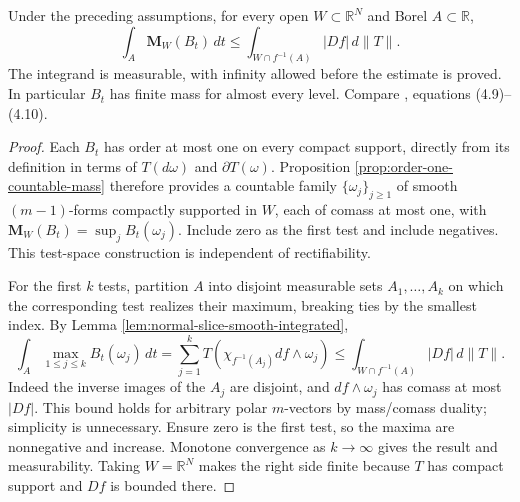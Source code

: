 \begin{proposition}\label{prop:normal-slice-smooth-mass}
Under the preceding assumptions, for every open $W\subset\mathbb R^N$ and Borel $A\subset\mathbb R$,
\[
 \int_A\mathbf M_W(B_t)\,dt
 \leq\int_{W\cap f^{-1}(A)}|Df|\,d\|T\|.
\]
The integrand is measurable, with infinity allowed before the estimate is proved. In particular $B_t$ has finite mass for almost every level. Compare \cite{Sim18}, equations (4.9)--(4.10).
\end{proposition}
\begin{proof}
Each $B_t$ has order at most one on every compact support, directly from its definition in terms of $T(d\omega)$ and $\partial T(\omega)$. Proposition \ref{prop:order-one-countable-mass} therefore provides a countable family $\{\omega_j\}_{j\geq1}$ of smooth $(m-1)$-forms compactly supported in $W$, each of comass at most one, with $\mathbf M_W(B_t)=\sup_j B_t(\omega_j)$. Include zero as the first test and include negatives. This test-space construction is independent of rectifiability.

For the first $k$ tests, partition $A$ into disjoint measurable sets $A_1,\ldots,A_k$ on which the corresponding test realizes their maximum, breaking ties by the smallest index. By Lemma \ref{lem:normal-slice-smooth-integrated},
\[
 \int_A\max_{1\leq j\leq k}B_t(\omega_j)\,dt
 =\sum_{j=1}^k T(\chi_{f^{-1}(A_j)}df\wedge\omega_j)
 \leq\int_{W\cap f^{-1}(A)}|Df|\,d\|T\|.
\]
Indeed the inverse images of the $A_j$ are disjoint, and $df\wedge\omega_j$ has comass at most $|Df|$. This bound holds for arbitrary polar $m$-vectors by mass/comass duality; simplicity is unnecessary. Ensure zero is the first test, so the maxima are nonnegative and increase. Monotone convergence as $k\to\infty$ gives the result and measurability. Taking $W=\mathbb R^N$ makes the right side finite because $T$ has compact support and $Df$ is bounded there.
\end{proof}

